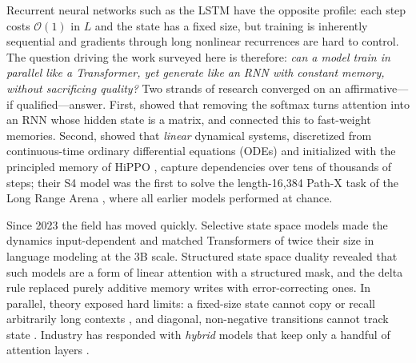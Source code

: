 \documentclass[a4paper]{article}
\newcommand{\bigO}{\mathcal{O}}
\theoremstyle{plain}
\theoremstyle{remark}
\begin{document}
Recurrent neural networks such as the LSTM \citep{hochreiter1997lstm} have the opposite profile: each step costs $\bigO(1)$ in $L$ and the state has a fixed size, but training is inherently sequential and gradients through long nonlinear recurrences are hard to control. The question driving the work surveyed here is therefore: \emph{can a model train in parallel like a Transformer, yet generate like an RNN with constant memory, without sacrificing quality?} Two strands of research converged on an affirmative---if qualified---answer. First, \citet{katharopoulos2020transformers} showed that removing the softmax turns attention into an RNN whose hidden state is a matrix, and \citet{schlag2021linear} connected this to fast-weight memories. Second, \citet{gu2022s4} showed that \emph{linear} dynamical systems, discretized from continuous-time ordinary differential equations (ODEs) and initialized with the principled memory of HiPPO \citep{gu2020hippo}, capture dependencies over tens of thousands of steps; their S4 model was the first to solve the length-16{,}384 Path-X task of the Long Range Arena \citep{tay2021lra}, where all earlier models performed at chance.

Since 2023 the field has moved quickly. Selective state space models \citep{gu2024mamba} made the dynamics input-dependent and matched Transformers of twice their size in language modeling at the 3B scale. Structured state space duality \citep{dao2024ssd} revealed that such models are a form of linear attention with a structured mask, and the delta rule \citep{yang2024deltanet,yang2025gated} replaced purely additive memory writes with error-correcting ones. In parallel, theory exposed hard limits: a fixed-size state cannot copy or recall arbitrarily long contexts \citep{jelassi2024repeat,arora2024zoology}, and diagonal, non-negative transitions cannot track state \citep{merrill2024illusion,grazzi2025negative}. Industry has responded with \emph{hybrid} models that keep only a handful of attention layers \citep{lieber2024jamba,minimax2025,nvidia2025nemotronh,kimi2025linear}.
\end{document}
